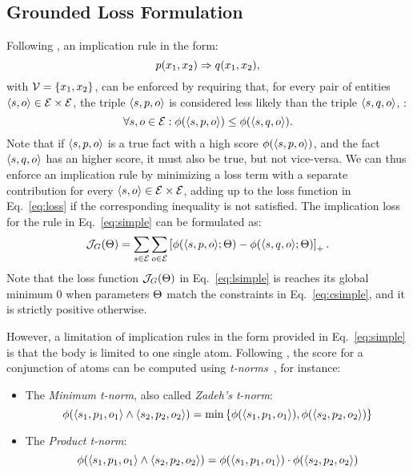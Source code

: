 %
\subsection{Grounded Loss Formulation}
%

Following \cite{DBLP:conf/emnlp/DemeesterRR16}, an implication rule in the form:
%
\begin{equation} \label{eq:simple}
%
 \rp(x_{1}, x_{2}) \Implies \relq(x_{1}, x_{2}),
%
\end{equation}
%
\noindent with $\mathcal{V} = \{ x_{1}, x_{2} \}$, can be enforced by requiring that, for every pair of entities $\langle s, o \rangle \in \mathcal{E} \times \mathcal{E}$, the triple $\langle s, p, o \rangle$ is considered less likely than the triple $\langle s, q, o \rangle$, \ie:
%
\begin{equation} \label{eq:csimple}
%
 \forall \rs, \ro \in \ents : \fscore(\spo) \leq \fscore(\sqo).
%
\end{equation}
%
Note that if $\langle s, p, o \rangle$ is a true fact with a high score $\phi(\langle s, p, o \rangle)$, and the fact $\langle s, q, o \rangle$ has an higher score, it must also be true, but not vice-versa.
%
We can thus enforce an implication rule by minimizing a loss term with a separate contribution for every $\langle s, o \rangle \in \mathcal{E} \times \mathcal{E}$, adding up to the loss function in Eq.~\ref{eq:loss} if the corresponding inequality is not satisfied.
%
The implication loss for the rule in Eq.~\ref{eq:simple} can be formulated as:
%
\begin{equation} \label{eq:lsimple}
%
 \loss_{G}(\params) = \sum_{\rs \in \ents} \sum_{\ro \in \ents} \hinge{\fscore(\spo ; \params) - \fscore(\sqo ; \params)}.
%
\end{equation}
%
Note that the loss function $\mathcal{J}_{G}(\Theta)$ in Eq.~\ref{eq:lsimple} is reaches its global minimum $0$ when parameters $\Theta$ match the constraints in Eq.~\ref{eq:csimple}, and it is strictly positive otherwise.
%

%
However, a limitation of implication rules in the form provided in Eq.~\ref{eq:simple} is that the body is limited to one single atom.
%
Following \cite{DBLP:conf/naacl/RocktaschelSR15}, the score for a conjunction of atoms can be computed using \emph{t-norms}~\cite{Gupta:1991:TTN:107687.107690}, for instance:
%
\begin{itemize}
%
 \item The \emph{Minimum t-norm}, also called \emph{Zadeh's t-norm}:
 \[ \phi(\langle s_{1}, p_{1}, o_{1} \rangle \land \langle s_{2}, p_{2}, o_{2} \rangle) = \min \left\{ \phi(\langle s_{1}, p_{1}, o_{1} \rangle), \phi(\langle s_{2}, p_{2}, o_{2} \rangle) \right\} \]
%
 \item The \emph{Product t-norm}:
 \[ \phi(\langle s_{1}, p_{1}, o_{1} \rangle \land \langle s_{2}, p_{2}, o_{2} \rangle) = \phi(\langle s_{1}, p_{1}, o_{1} \rangle) \cdot \phi(\langle s_{2}, p_{2}, o_{2} \rangle) \]
%
\end{itemize}
%

